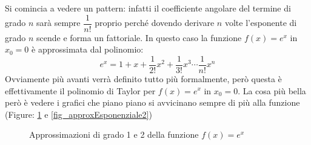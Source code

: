 Si comincia a vedere un pattern: infatti il coefficiente angolare del termine 
di grado $n$ sarà sempre $\dfrac{1}{n!}$ proprio perché dovendo derivare $n$ 
volte l'esponente di grado $n$ scende e forma un fattoriale. In questo caso la 
funzione $f(x) = e^x$ in $x_0 = 0$ è approssimata dal polinomio:
\begin{equation*}
	e^x = 1 + x + \dfrac{1}{2!}x^2 + \dfrac{1}{3!} x^3 \cdots \dfrac{1}{n!} x^n
\end{equation*}
Ovviamente più avanti verrà definito tutto più formalmente, però questa è 
effettivamente il polinomio di Taylor per $f(x) = e^x$ in $x_0 = 0$. La cosa 
più bella però è vedere i grafici che piano piano si avvicinano sempre di più 
alla funzione (Figure: \ref{fig_approxEsponenziale1} e 
\ref{fig_approxEsponenziale2})

\begin{figure}
\centering
\begin{subfigure}{0.49\textwidth}
\centering
\end{subfigure}
\begin{subfigure}{0.49\textwidth}
\centering
\end{subfigure}
	\caption{Approssimazioni di grado 1 e 2 della funzione $f(x) = e^x$} 
\label{fig_approxEsponenziale1}
\end{figure}


